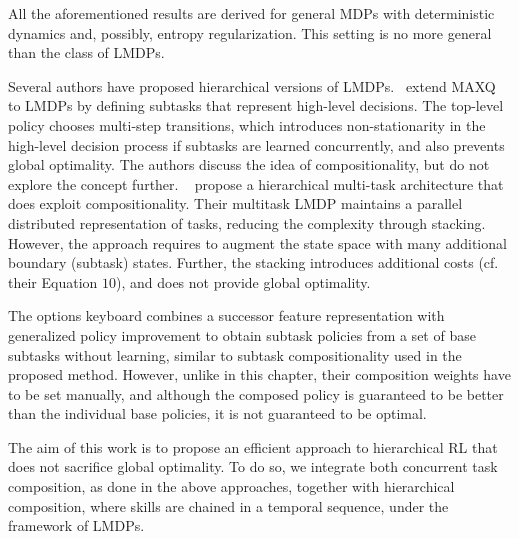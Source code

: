 All the aforementioned results are derived for general MDPs with deterministic dynamics and, possibly, entropy regularization. This setting is no more general than the class of LMDPs.



Several authors have proposed hierarchical versions of LMDPs.~\cite{Jonsson2016} extend MAXQ~\citep{Dietterich2000} to LMDPs by defining subtasks that represent high-level decisions. The top-level policy chooses multi-step transitions, which introduces non-stationarity in the high-level decision process if subtasks are learned concurrently, and also prevents global optimality. The authors discuss the idea of compositionality, but do not explore the concept further.
~\citet{Saxe2017} propose a hierarchical multi-task architecture that does exploit compositionality. Their multitask LMDP maintains a parallel distributed representation of tasks, reducing the complexity through stacking. However, the approach requires to augment the state space with many additional boundary (subtask) states. Further, the stacking introduces additional costs (cf. their Equation $10$), and does not provide global optimality.

The options keyboard \citep{Barreto2019} combines a successor feature representation with generalized policy improvement to obtain subtask policies from a set of base subtasks without learning, similar to subtask compositionality used in the proposed method. However, unlike in this chapter, their composition weights have to be set manually, and although the composed policy is guaranteed to be better than the individual base policies, it is not guaranteed to be optimal.

The aim of this work is to propose an efficient approach to hierarchical RL that does not sacrifice global optimality. To do so, we integrate both concurrent task composition, as done in the above approaches, together with hierarchical composition, where skills are chained in a temporal sequence, under the framework of LMDPs.

